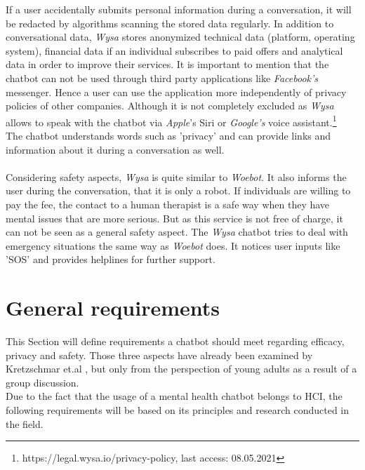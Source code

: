 \documentclass[sigconf, nonacm]{acmart}
\begin{document}
If a user accidentally submits personal information during a conversation, it will be redacted by algorithms scanning the stored data regularly. In addition to conversational data, \emph{Wysa} stores anonymized technical data (platform, operating system), 
financial data if an individual subscribes to paid offers and analytical data in order to improve their services. 
It is important to mention that the chatbot can not be used through third party applications like \emph{Facebook's} messenger. Hence a user can use the application more independently of privacy policies of other companies. Although it is not completely excluded as \emph{Wysa} allows to speak with the chatbot 
via \emph{Apple}'s Siri or \emph{Google's} voice assistant.\footnote{https://legal.wysa.io/privacy-policy, last access: 08.05.2021}
\\
The chatbot understands words such as 'privacy' and can provide links and information about it during a conversation as well.\cite{Kretzschmar2019}
\\\\
Considering safety aspects, \emph{Wysa} is quite similar to \emph{Woebot}. It also informs the user during the conversation, that it is only a robot. If individuals are willing to pay the fee, the contact to a human therapist is a safe way when they have mental issues that are 
more serious. But as this service is not free of charge, it can not be seen as a general safety aspect. The \emph{Wysa} chatbot tries to deal with emergency situations the same way as \emph{Woebot} does. It notices user inputs like 'SOS' and provides helplines for further support.\cite{Kretzschmar2019}
\section{General requirements}
\label{sec:three}
This Section will define requirements a chatbot should meet regarding efficacy, privacy and safety. Those three aspects have already been examined by Kretzschmar et.al \cite{Kretzschmar2019}, but only from the perspection of young adults as a result of a group discussion.
\\
Due to the fact that the usage of a mental health chatbot belongs to HCI, the following requirements will be based on its principles and research conducted in the field.
\end{document}
